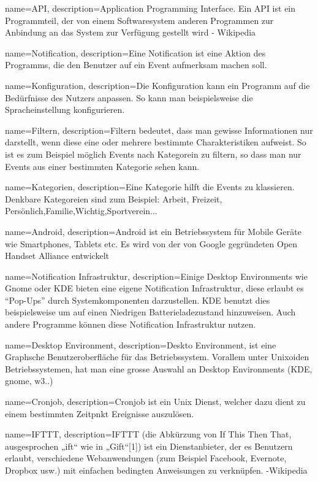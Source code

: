 {
  name=API,
  description={Application Programming Interface. Ein API ist ein Programmteil, der von einem Softwaresystem anderen
  Programmen zur Anbindung an das System zur Verfügung gestellt wird
  - Wikipedia}
} 

{
  name=Notification,
  description={Eine Notification ist eine Aktion des Programms, die den Benutzer auf ein Event aufmerksam machen soll.}
} 

{
  name=Konfiguration,
  description={Die Konfiguration kann ein Programm auf die Bedürfnisse des Nutzers anpassen. So kann man beispielsweise
   die Spracheinstellung konfigurieren.}
} 

{
  name=Filtern,
  description={Filtern bedeutet, dass man gewisse Informationen nur darstellt, wenn diese eine oder mehrere bestimmte Charakteristiken aufweist. So ist es zum Beispiel möglich Events nach Kategorein zu filtern, so dass man nur Events aus einer bestimmten Kategorie sehen kann.}
} 


{
  name=Kategorien,
  description={Eine Kategorie hilft die Events zu klassieren. Denkbare Kategoreien sind zum Beispiel: Arbeit, Freizeit, Persönlich,Familie,Wichtig,Sportverein... }
} 

{
  name=Android,
  description={Android ist ein Betriebssystem für Mobile Geräte wie Smartphones, Tablets etc.
   Es wird von der von Google gegründeten Open Handset Alliance entwickelt}
}

{
  name=Notification Infrastruktur,
  description={Einige Desktop Environments  wie Gnome oder KDE bieten eine eigene Notification Infrastruktur, diese erlaubt es ``Pop-Ups'' durch Systemkomponenten darzustellen. KDE benutzt dies beispielsweise um auf einen Niedrigen Batterieladezustand hinzuweisen. Auch andere Programme können diese Notification Infrastruktur nutzen. }
} 

{
  name=Desktop Environment,
  description={Deskto Environment, ist eine Graphsche Benutzeroberfläche für das Betriebssystem. Vorallem unter
  Unixoiden Betriebssystemen, hat man eine grosse Auswahl an Desktop Environments (KDE, gnome, w3..)}
} 

{
  name=Cronjob,
  description={Cronjob ist ein Unix Dienst, welcher dazu dient zu einem bestimmten Zeitpnkt Ereignisse auszulösen.}
} 



{
  name=IFTTT,
  description={IFTTT (die Abkürzung von If This Then That, ausgesprochen „ift“ wie in „Gift“[1]) ist ein Dienstanbieter,
  der es Benutzern erlaubt, verschiedene Webanwendungen (zum Beispiel Facebook, Evernote, Dropbox usw.) mit einfachen
  bedingten Anweisungen zu verknüpfen.
   -Wikipedia}
} 





